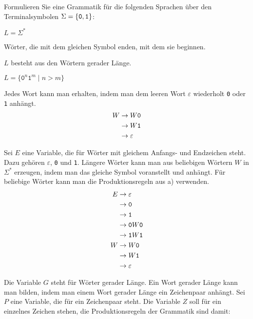 Formulieren Sie eine Grammatik für die folgenden Sprachen über
den Terminalsymbolen $\Sigma=\{{\tt 0},{\tt 1}\}$:
\begin{teilaufgaben}
\item $L=\Sigma^*$
\item Wörter, die mit dem gleichen Symbol enden, mit dem sie beginnen.
\item $L$ besteht aus den Wörtern gerader Länge.
\item $L=\{\texttt{0}^n\texttt{1}^m\mid n>m\}$
\end{teilaufgaben}


\begin{loesung}
\begin{teilaufgaben}
\item
Jedes Wort kann man erhalten, indem man dem leeren Wort $\varepsilon$
wiederholt {\tt 0} oder {\tt 1} anhängt.
\begin{align*}
W&\rightarrow W{\tt 0}\\
 &\rightarrow W{\tt 1}\\
 &\rightarrow\varepsilon
\end{align*}
\item Sei $E$ eine Variable, die für Wörter mit gleichem Anfangs-
und Endzeichen steht. Dazu gehören $\varepsilon$, {\tt 0} und {\tt 1}.
Längere
Wörter kann man aus beliebigen Wörtern $W$ in $\Sigma^*$ erzeugen,
indem man das gleiche Symbol voranstellt und anhängt. Für beliebige
Wörter kann
man die Produktionsregeln aus a) verwenden.
\begin{align*}
E&\rightarrow \varepsilon\\
 &\rightarrow {\tt 0}\\
 &\rightarrow {\tt 1}\\
 &\rightarrow {\tt 0}W{\tt 0}\\
 &\rightarrow {\tt 1}W{\tt 1}\\
W&\rightarrow W{\tt 0}\\
 &\rightarrow W{\tt 1}\\
 &\rightarrow\varepsilon
\end{align*}
\item Die Variable $G$ steht für Wörter gerader Länge. Ein Wort
gerader Länge kann man bilden, indem man einem Wort gerader Länge
ein Zeichenpaar anhängt. Sei $P$ eine Variable, die für ein Zeichenpaar
steht. Die Variable $Z$ soll für ein einzelnes Zeichen stehen, die
Produktionsregeln der Grammatik sind damit:
\begin{align*}

\end{align*}
\end{teilaufgaben}
\end{loesung}
